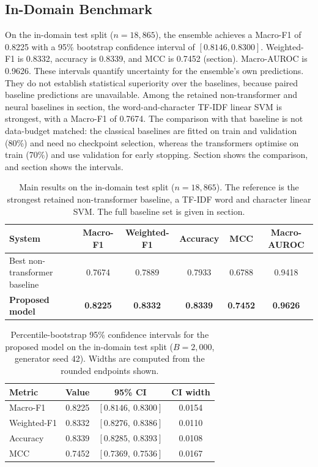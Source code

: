 \documentclass[11pt,a4paper]{article}
\def\Cref#1{Section}%
\def\cref#1{section}%
\begin{document}
\subsection{In-Domain Benchmark}
\label{sec:main-results}

On the in-domain test split ($n=18{,}865$), the ensemble achieves a Macro-F1 of 0.8225 with a 95\% bootstrap confidence interval of $[0.8146, 0.8300]$. Weighted-F1 is 0.8332, accuracy is 0.8339, and MCC is 0.7452 (\cref{tab:main,tab:ci}). Macro-AUROC is 0.9626. These intervals quantify uncertainty for the ensemble's own predictions. They do not establish statistical superiority over the baselines, because paired baseline predictions are unavailable. Among the retained non-transformer and neural baselines in \cref{tab:baseline-full}, the word-and-character TF-IDF linear SVM is strongest, with a Macro-F1 of 0.7674. The comparison with that baseline is not data-budget matched: the classical baselines are fitted on train and validation (80\%) and need no checkpoint selection, whereas the transformers optimise on train (70\%) and use validation for early stopping. \Cref{fig:main} shows the comparison, and \cref{fig:ci} shows the intervals.

\begin{table}[!htbp]
\centering
\caption{Main results on the in-domain test split ($n = 18{,}865$). The reference is the strongest retained non-transformer baseline, a TF-IDF word and character linear SVM. The full baseline set is given in \cref{tab:baseline-full}.}
\label{tab:main}
\small
\begin{tabular}{@{}lccccc@{}}
\toprule
\textbf{System} & \textbf{Macro-F1} & \textbf{Weighted-F1} & \textbf{Accuracy} & \textbf{MCC} & \textbf{Macro-AUROC} \\
\midrule
Best non-transformer baseline & 0.7674 & 0.7889 & 0.7933 & 0.6788 & 0.9418 \\
\textbf{Proposed model} & \textbf{0.8225} & \textbf{0.8332} & \textbf{0.8339} & \textbf{0.7452} & \textbf{0.9626} \\
\bottomrule
\end{tabular}
\end{table}

\begin{table}[!htbp]
\centering
\caption{Percentile-bootstrap 95\% confidence intervals for the proposed model on the in-domain test split ($B = 2{,}000$, generator seed 42). Widths are computed from the rounded endpoints shown.}
\label{tab:ci}
\small
\begin{tabular}{@{}lccc@{}}
\toprule
\textbf{Metric} & \textbf{Value} & \textbf{95\% CI} & \textbf{CI width} \\
\midrule
Macro-F1 & 0.8225 & $[0.8146,\ 0.8300]$ & 0.0154 \\
Weighted-F1 & 0.8332 & $[0.8276,\ 0.8386]$ & 0.0110 \\
Accuracy & 0.8339 & $[0.8285,\ 0.8393]$ & 0.0108 \\
MCC & 0.7452 & $[0.7369,\ 0.7536]$ & 0.0167 \\
\bottomrule
\end{tabular}
\end{table}
\end{document}

